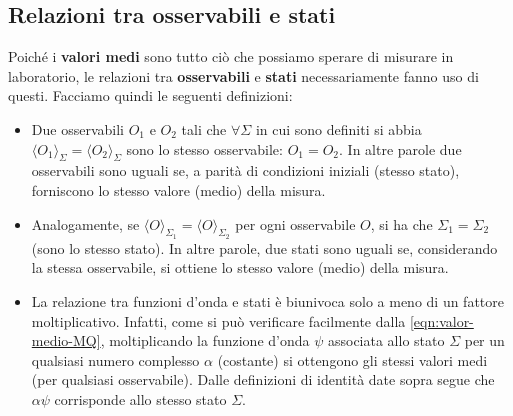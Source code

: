\documentclass[FisicaTeorica.tex]{subfiles}
\begin{document}
\subsection{Relazioni tra osservabili e stati}
Poiché i \textbf{valori medi} sono tutto ciò che possiamo sperare di misurare in laboratorio, le relazioni tra \textbf{osservabili} e \textbf{stati} necessariamente fanno uso di questi. Facciamo quindi le seguenti definizioni:
\begin{itemize}
    \item Due osservabili   $O_1$ e $O_2$ tali che $\forall \Sigma$ in cui sono definiti si abbia $\langle O_1 \rangle_\Sigma = \langle O_2 \rangle_\Sigma$ sono lo stesso osservabile: $O_1 = O_2$. In altre parole due osservabili sono uguali se, a parità di condizioni iniziali (stesso stato), forniscono lo stesso valore (medio) della misura.
    \item Analogamente,  se $\langle O \rangle_{\Sigma_1} = \langle O \rangle_{\Sigma_2}$ per ogni osservabile $O$, si ha che $\Sigma_1 = \Sigma_2$ (sono lo stesso stato). In altre parole, due stati sono uguali se, considerando la stessa osservabile, si ottiene lo stesso valore (medio) della misura.
    \item La relazione tra funzioni d'onda e stati è biunivoca solo a meno di un fattore moltiplicativo. Infatti, come si può verificare facilmente dalla \eqref{eqn:valor-medio-MQ}, moltiplicando la funzione d'onda $\psi$ associata allo stato $\Sigma$ per un qualsiasi numero complesso $\alpha$ (costante) si ottengono gli stessi valori medi (per qualsiasi osservabile). Dalle definizioni di identità date sopra segue che $\alpha \psi$ corrisponde allo stesso stato $\Sigma$.
\end{itemize}
\end{document}
